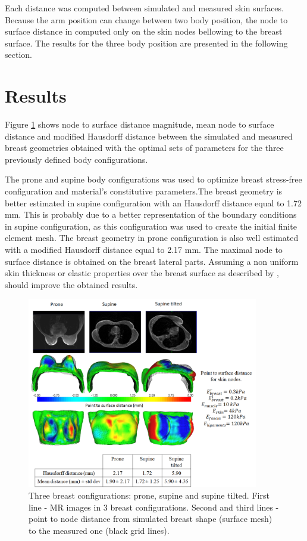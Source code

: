 Each distance was computed between simulated and measured skin surfaces. Because the arm position can change between two body position, the node to surface distance in computed only on the skin nodes bellowing to the breast surface. The results for the three body position are presented in the following section. 

\section{Results}\label{section:multi-loadinggravityvalidation}

Figure \ref{fig:modelevaluation} shows node to surface distance magnitude, mean node to surface distance and modified Hausdorff distance between the simulated and measured breast geometries obtained with the optimal sets of parameters for the three previously defined body configurations.
 
The prone and supine body configurations was used to optimize breast stress-free configuration and material's constitutive parameters.The breast geometry is better estimated in supine configuration with an Hausdorff distance equal to 1.72 mm. This is probably due to a better representation of the boundary conditions in supine configuration, as this configuration was used to create the initial finite element mesh. The breast geometry in prone configuration is also well estimated with a modified Hausdorff distance equal to 2.17 mm. The maximal node to surface distance is obtained on the breast lateral parts.  Assuming a non uniform skin thickness or elastic properties over the breast surface as described by \cite{sutradhar_vivo_2013}, should improve the obtained results. 

\begin{figure}[!h]
\centering
\includegraphics[width=0.9\textwidth,keepaspectratio]{figures/modelevaluation.png} 
\caption{Three breast configurations: prone, supine and supine tilted. First line - MR images in 3 breast configurations. Second and third lines - point to node distance from simulated breast shape (surface mesh) to the measured one (black grid lines).}\label{fig:modelevaluation}
\end{figure}

